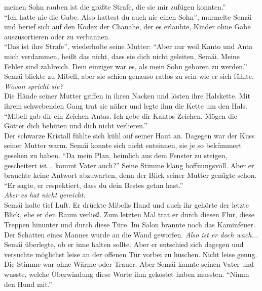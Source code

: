 meinen Sohn rauben ist die größte Strafe, die sie mir zufügen konnten.''\\
``Ich hatte nie die Gabe. Also hattest du auch nie einen Sohn'', murmelte Semái und berief sich auf 
den Kodex der Chanahe, der es erlaubte, Kinder ohne Gabe auszusortieren oder zu verbannen.\\
``Das ist ihre Strafe'', wiederholte seine Mutter: ``Aber nur weil Kanto und Anta mich verdammen, 
heißt das nicht, dass sie dich nicht geleiten, Semái. Meine Fehler sind zahlreich. Dein einziger 
war es, als mein Sohn geboren zu werden.''\\
Semái blickte zu Mibell, aber sie schien genauso ratlos zu sein wie er sich fühlte. \textit{Wovon 
spricht sie?}\\
Die Hände seiner Mutter griffen in ihren Nacken und lösten ihre Halskette. Mit ihrem schwebenden 
Gang trat sie näher und legte ihm die Kette um den Hals. ``Mibell gab dir ein Zeichen Antas. Ich 
gebe dir Kantos Zeichen. Mögen die Götter dich behüten und dich nicht verlieren.''\\
Der schwarze Kristall fühlte sich kühl auf seiner Haut an. Dagegen war der Kuss seiner Mutter warm. 
Semái konnte sich nicht entsinnen, sie je so bekümmert gesehen zu haben. ``Da mein Plan, heimlich 
aus dem Fenster zu steigen, gescheitert ist... kommt Vater auch?'' Seine Stimme klang 
hoffnungsvoll. Aber er brauchte keine Antwort abzuwarten, denn der Blick seiner Mutter genügte 
schon. \\
``Er sagte, er respektiert, dass du dein Bestes getan hast.''\\
\textit{Aber es hat nicht gereicht.}\\
Semái holte tief Luft. Er drückte Mibells Hand und auch ihr gehörte der letzte Blick, ehe er den 
Raum verließ. Zum letzten Mal trat er durch diesen Flur, diese Treppen hinunter und durch diese 
Türe. Im Salon brannte noch das Kaminfeuer. Der Schatten eines Mannes wurde an die Wand geworfen. 
\textit{Also ist er doch wach...}\\
Semái überlegte, ob er inne halten sollte. Aber er entschied sich dagegen und versuchte möglichst 
leise an der offenen Tür vorbei zu huschen. Nicht leise genug. \\
Die Stimme war ohne Wärme oder Trauer. Aber Semái kannte seinen Vater und 
wusste, welche Überwindung diese Worte ihm gekostet haben mussten. ``Nimm den Hund mit.''\\


